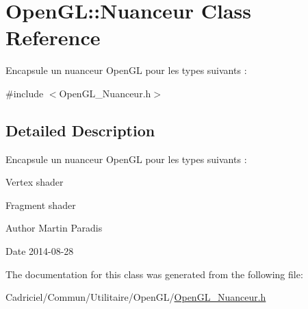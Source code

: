 \hypertarget{class_open_g_l_1_1_nuanceur}{}\section{Open\+GL\+:\+:Nuanceur Class Reference}
\label{class_open_g_l_1_1_nuanceur}


Encapsule un nuanceur Open\+GL pour les types suivants \+:  




{\ttfamily \#include $<$Open\+G\+L\+\_\+\+Nuanceur.\+h$>$}



\subsection{Detailed Description}
Encapsule un nuanceur Open\+GL pour les types suivants \+: 


\begin{DoxyItemize}
\item Vertex shader
\item Fragment shader
\end{DoxyItemize}

\begin{DoxyAuthor}{Author}
Martin Paradis 
\end{DoxyAuthor}
\begin{DoxyDate}{Date}
2014-\/08-\/28 
\end{DoxyDate}


The documentation for this class was generated from the following file\+:\begin{DoxyCompactItemize}
\item 
Cadriciel/\+Commun/\+Utilitaire/\+Open\+G\+L/\hyperlink{_open_g_l___nuanceur_8h}{Open\+G\+L\+\_\+\+Nuanceur.\+h}\end{DoxyCompactItemize}
